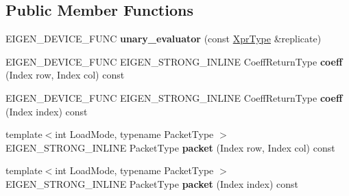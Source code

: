 \subsection*{Public Member Functions}
\begin{DoxyCompactItemize}
\item 
\mbox{\label{struct_eigen_1_1internal_1_1unary__evaluator_3_01_replicate_3_01_arg_type_00_01_row_factor_00_01_col_factor_01_4_01_4_a40cd28c769315ad3a71a33d6f371c14a}} 
E\+I\+G\+E\+N\+\_\+\+D\+E\+V\+I\+C\+E\+\_\+\+F\+U\+NC {\bfseries unary\+\_\+evaluator} (const \mbox{\hyperlink{class_eigen_1_1_replicate}{Xpr\+Type}} \&replicate)
\item 
\mbox{\label{struct_eigen_1_1internal_1_1unary__evaluator_3_01_replicate_3_01_arg_type_00_01_row_factor_00_01_col_factor_01_4_01_4_a1d7cfcb24f404ce54f84516c3e3edfe0}} 
E\+I\+G\+E\+N\+\_\+\+D\+E\+V\+I\+C\+E\+\_\+\+F\+U\+NC E\+I\+G\+E\+N\+\_\+\+S\+T\+R\+O\+N\+G\+\_\+\+I\+N\+L\+I\+NE Coeff\+Return\+Type {\bfseries coeff} (Index row, Index col) const
\item 
\mbox{\label{struct_eigen_1_1internal_1_1unary__evaluator_3_01_replicate_3_01_arg_type_00_01_row_factor_00_01_col_factor_01_4_01_4_a785a88469c65e80ed0edcacff52de5d2}} 
E\+I\+G\+E\+N\+\_\+\+D\+E\+V\+I\+C\+E\+\_\+\+F\+U\+NC E\+I\+G\+E\+N\+\_\+\+S\+T\+R\+O\+N\+G\+\_\+\+I\+N\+L\+I\+NE Coeff\+Return\+Type {\bfseries coeff} (Index index) const
\item 
\mbox{\label{struct_eigen_1_1internal_1_1unary__evaluator_3_01_replicate_3_01_arg_type_00_01_row_factor_00_01_col_factor_01_4_01_4_ab204763236c75b105b51d03e6afc748c}} 
{\footnotesize template$<$int Load\+Mode, typename Packet\+Type $>$ }\\E\+I\+G\+E\+N\+\_\+\+S\+T\+R\+O\+N\+G\+\_\+\+I\+N\+L\+I\+NE Packet\+Type {\bfseries packet} (Index row, Index col) const
\item 
\mbox{\label{struct_eigen_1_1internal_1_1unary__evaluator_3_01_replicate_3_01_arg_type_00_01_row_factor_00_01_col_factor_01_4_01_4_a7132e798ac3753d1d0c4cee1c2832026}} 
{\footnotesize template$<$int Load\+Mode, typename Packet\+Type $>$ }\\E\+I\+G\+E\+N\+\_\+\+S\+T\+R\+O\+N\+G\+\_\+\+I\+N\+L\+I\+NE Packet\+Type {\bfseries packet} (Index index) const
\end{DoxyCompactItemize}

